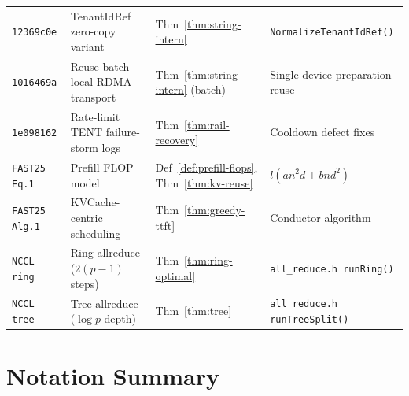 \documentclass[11pt,a4paper,twoside]{article}
\theoremstyle{plain}
\theoremstyle{definition}
\theoremstyle{remark}
\begin{document}
\begin{small}
\begin{longtable}{p{1.6cm}p{4.5cm}p{2.5cm}p{4.5cm}}
\texttt{12369c0e} & TenantIdRef zero-copy variant &
  Thm~\ref{thm:string-intern} &
  \texttt{NormalizeTenantIdRef()} \\

\texttt{1016469a} & Reuse batch-local RDMA transport &
  Thm~\ref{thm:string-intern} (batch) &
  Single-device preparation reuse \\

\texttt{1e098162} & Rate-limit TENT failure-storm logs &
  Thm~\ref{thm:rail-recovery} &
  Cooldown defect fixes \\

\texttt{FAST25 Eq.1} & Prefill FLOP model &
  Def~\ref{def:prefill-flops}, Thm~\ref{thm:kv-reuse} &
  $l(an^2d + bnd^2)$ \\

\texttt{FAST25 Alg.1} & KVCache-centric scheduling &
  Thm~\ref{thm:greedy-ttft} &
  Conductor algorithm \\

\texttt{NCCL ring} & Ring allreduce ($2(p{-}1)$ steps) &
  Thm~\ref{thm:ring-optimal} &
  \texttt{all\_reduce.h runRing()} \\

\texttt{NCCL tree} & Tree allreduce ($\log p$ depth) &
  Thm~\ref{thm:tree} &
  \texttt{all\_reduce.h runTreeSplit()} \\

\end{longtable}
\end{small}


\appendix
\section{Notation Summary}
\end{document}
